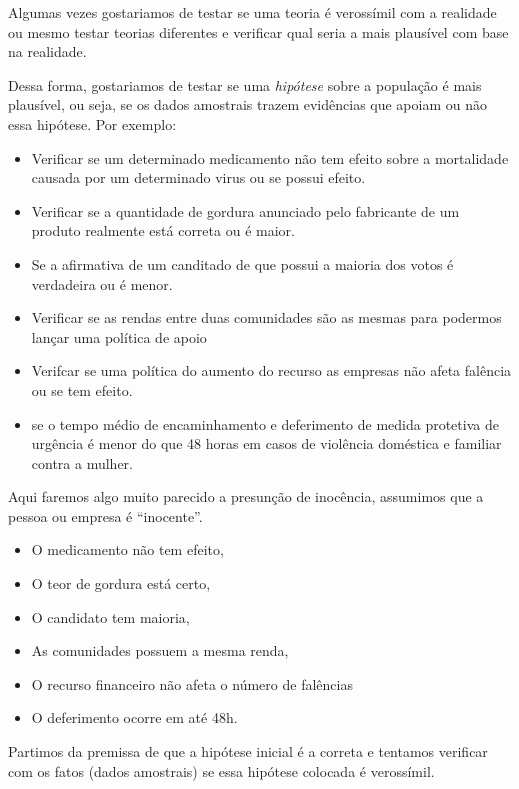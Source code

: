 \documentclass[
  letterpaper,
  DIV=11,
  numbers=noendperiod]{scrreprt}
\providecommand{\tightlist}{%
  \setlength{\itemsep}{0pt}\setlength{\parskip}{0pt}}
\begin{document}
Algumas vezes gostariamos de testar se uma teoria é verossímil com a
realidade ou mesmo testar teorias diferentes e verificar qual seria a
mais plausível com base na realidade.

Dessa forma, gostariamos de testar se uma \textit{hipótese} sobre a
população é mais plausível, ou seja, se os dados amostrais trazem
evidências que apoiam ou não essa hipótese. Por exemplo:

\begin{itemize}
\tightlist
\item
  Verificar se um determinado medicamento não tem efeito sobre a
  mortalidade causada por um determinado virus ou se possui efeito.
\item
  Verificar se a quantidade de gordura anunciado pelo fabricante de um
  produto realmente está correta ou é maior.
\item
  Se a afirmativa de um canditado de que possui a maioria dos votos é
  verdadeira ou é menor.
\item
  Verificar se as rendas entre duas comunidades são as mesmas para
  podermos lançar uma política de apoio
\item
  Verifcar se uma política do aumento do recurso as empresas não afeta
  falência ou se tem efeito.
\item
  se o tempo médio de encaminhamento e deferimento de medida protetiva
  de urgência é menor do que 48 horas em casos de violência doméstica e
  familiar contra a mulher.
\end{itemize}

Aqui faremos algo muito parecido a presunção de inocência, assumimos que
a pessoa ou empresa é ``inocente''.

\begin{itemize}
\tightlist
\item
  O medicamento não tem efeito,
\item
  O teor de gordura está certo,
\item
  O candidato tem maioria,
\item
  As comunidades possuem a mesma renda,
\item
  O recurso financeiro não afeta o número de falências
\item
  O deferimento ocorre em até 48h.
\end{itemize}

\begin{tcolorbox}[enhanced jigsaw, leftrule=.75mm, coltitle=black, colframe=quarto-callout-note-color-frame, toprule=.15mm, opacitybacktitle=0.6, bottomtitle=1mm, bottomrule=.15mm, titlerule=0mm, toptitle=1mm, title=\textcolor{quarto-callout-note-color}{\faInfo}\hspace{0.5em}{A Intuição}, arc=.35mm, breakable, opacityback=0, colbacktitle=quarto-callout-note-color!10!white, colback=white, left=2mm, rightrule=.15mm]

Partimos da premissa de que a hipótese inicial é a correta e tentamos
verificar com os fatos (dados amostrais) se essa hipótese colocada é
verossímil.

\end{tcolorbox}
\end{document}
